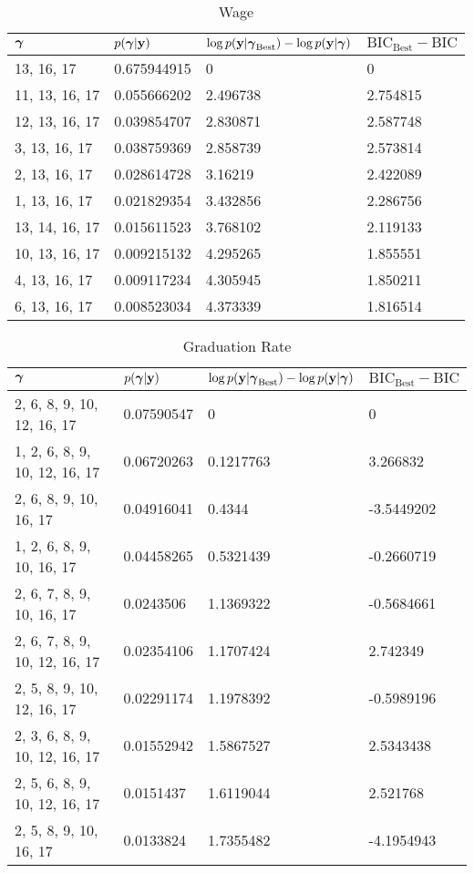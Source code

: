\documentclass{amsart}
\begin{document}
\begin{table}
\label{tab:numerical_results3}
\caption{Wage}
\begin{tabular}{|l|lll|}
\hline
${\boldsymbol \gamma}$ & $p({\boldsymbol \gamma}|{\bf y})$ & $\log p({\bf y} | {\boldsymbol \gamma}_\text{Best}) - \log p({\bf y} | {\boldsymbol \gamma})$ & $\text{BIC}_\text{Best} - \text{BIC}$ \\
\hline
13, 16, 17 & 0.675944915 & 0 & 0 \\
11, 13, 16, 17 & 0.055666202 & 2.496738 & 2.754815 \\
12, 13, 16, 17 & 0.039854707 & 2.830871 & 2.587748 \\
3, 13, 16, 17 & 0.038759369 & 2.858739 & 2.573814 \\
2, 13, 16, 17 & 0.028614728 & 3.16219 & 2.422089 \\
1, 13, 16, 17 & 0.021829354 & 3.432856 & 2.286756 \\
13, 14, 16, 17 & 0.015611523 & 3.768102 & 2.119133 \\
10, 13, 16, 17 & 0.009215132 & 4.295265 & 1.855551 \\
4, 13, 16, 17 & 0.009117234 & 4.305945 & 1.850211 \\
6, 13, 16, 17 & 0.008523034 & 4.373339 & 1.816514 \\
\hline
\end{tabular}
\end{table}

\begin{table}
\label{tab:numerical_results4}
\caption{Graduation Rate}
\begin{tabular}{|l|lll|}
\hline
${\boldsymbol \gamma}$ & $p({\boldsymbol \gamma}|{\bf y})$ & $\log p({\bf y} | {\boldsymbol \gamma}_\text{Best}) - \log p({\bf y} | {\boldsymbol \gamma})$ & $\text{BIC}_\text{Best} - \text{BIC}$ \\
\hline
2, 6, 8, 9, 10, 12, 16, 17 & 0.07590547 & 0 & 0 \\
1, 2, 6, 8, 9, 10, 12, 16, 17 & 0.06720263 & 0.1217763 & 3.266832 \\
2, 6, 8, 9, 10, 16, 17 & 0.04916041 & 0.4344 & -3.5449202 \\
1, 2, 6, 8, 9, 10, 16, 17 & 0.04458265 & 0.5321439 & -0.2660719 \\
2, 6, 7, 8, 9, 10, 16, 17 & 0.0243506 & 1.1369322 & -0.5684661 \\
2, 6, 7, 8, 9, 10, 12, 16, 17 & 0.02354106 & 1.1707424 & 2.742349 \\
2, 5, 8, 9, 10, 12, 16, 17 & 0.02291174 & 1.1978392 & -0.5989196 \\
2, 3, 6, 8, 9, 10, 12, 16, 17 & 0.01552942 & 1.5867527 & 2.5343438 \\
2, 5, 6, 8, 9, 10, 12, 16, 17 & 0.0151437 & 1.6119044 & 2.521768 \\
2, 5, 8, 9, 10, 16, 17 & 0.0133824 & 1.7355482 & -4.1954943 \\
\hline
\end{tabular}
\end{table}
\end{document}
